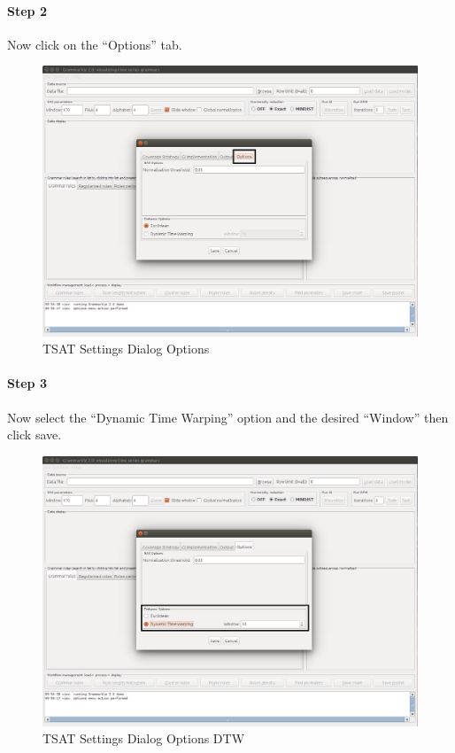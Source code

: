 \documentclass[letterpaper, 12pt]{article}
\begin{document}
\newpage
\paragraph{Step 2}
Now click on the ``Options'' tab.

\begin{figure}[H]
  \includegraphics[width=\textwidth]{TSAT-settings-dialog-options}
  \caption{TSAT Settings Dialog Options}
  \label{fig:TSAT-settings-dialog-options}
\end{figure}

\newpage
\paragraph{Step 3}
Now select the ``Dynamic Time Warping'' option and the desired ``Window'' then click save.

\begin{figure}[H]
  \includegraphics[width=\textwidth]{TSAT-settings-dialog-options-dtw}
  \caption{TSAT Settings Dialog Options DTW}
  \label{fig:TSAT-settings-dialog-options-dtw}
\end{figure}
\end{document}
